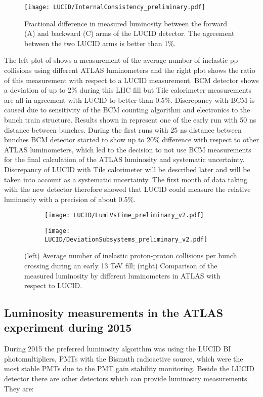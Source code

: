 \begin{figure}
\centering
\texttt{[image: LUCID/InternalConsistency\_preliminary.pdf]}
\caption{Fractional difference in measured luminosity between the forward (A) and backward (C) arms of the LUCID 
detector. The agreement between the two LUCID arms is better than 1$\%$.}
\label{fig:InternalConsistency}
\end{figure}

The left plot of  shows a measurement of the average number of inelastic pp collisions 
using different ATLAS 
luminometers and the right plot shows the ratio of this measurement with respect to a LUCID measurement. BCM 
detector shows a deviation of up to 2$\%$ during this LHC fill but Tile calorimeter measurements are all in agreement 
with LUCID to better than 0.5$\%$.
Discrepancy with BCM is caused due to sensitivity of the BCM counting algorithm and electronics to the bunch train structure.
Results shown in  represent one of the early run with 50 ns distance between bunches.
During the first runs with 25 ns distance between bunches BCM detector started to show up to 20$\%$ difference 
with respect to other ATLAS luminometers, which led to the decision to not use BCM measurements for the final calculation of the ATLAS luminosity and systematic uncertainty.
Discrepancy of LUCID with Tile calorimeter will be described later and will be taken into account as a systematic uncertainty.
The first month of data taking with the new detector therefore showed that LUCID could measure the relative 
luminosity with a precision of about 0.5$\%$.

\begin{figure}
\centering
\begin{subfigure}{.5\textwidth}
  \centering
  \texttt{[image: LUCID/LumiVsTime\_preliminary\_v2.pdf]}
  \label{fig:sub3}
\end{subfigure}%
\begin{subfigure}{.5\textwidth}
  \centering
  \texttt{[image: LUCID/DeviationSubsystems\_preliminary\_v2.pdf]}
  \label{fig:sub4}
\end{subfigure}
\caption{(left) Average number of inelastic proton-proton collisions per bunch crossing during an early 13 TeV fill; 
(right) Comparison of the measured luminosity by different luminometers in ATLAS with respect to LUCID.}
\label{fig:LumiVsTime}
\end{figure}

\subsection{Luminosity measurements in the ATLAS experiment during 2015}
\label{subsec:lumi_2015_2016}
During 2015 the preferred luminosity algorithm was using the LUCID BI photomultipliers, 
PMTs with the Bismuth radioactive source, which were the most stable PMTs due to the PMT gain stability monitoring.
Beside the LUCID detector there are other detectors which can provide luminosity measurements. They are: 

